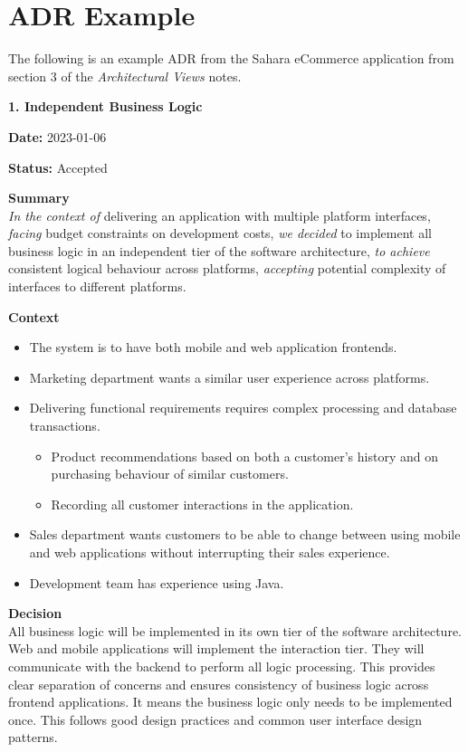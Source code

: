 \section{ADR Example}
The following is an example ADR from the Sahara eCommerce application from section 3 of the \textit{Architectural Views} notes.
\newline

\noindent\textbf{1. Independent Business Logic}

\noindent\textbf{Date:} 2023-01-06

\noindent\textbf{Status:} Accepted

\noindent\textbf{Summary}\\
\emph{In the context of} delivering an application with multiple platform interfaces,  
\emph{facing} budget constraints on development costs,  
\emph{we decided} to implement all business logic in an independent tier of the software architecture,  
\emph{to achieve} consistent logical behaviour across platforms,  
\emph{accepting} potential complexity of interfaces to different platforms.

\noindent\textbf{Context}
\begin{itemize}[noitemsep,nolistsep]
    \item The system is to have both mobile and web application frontends.
    \item Marketing department wants a similar user experience across platforms.
    \item Delivering functional requirements requires complex processing and database transactions.
    \begin{itemize}[noitemsep,nolistsep]
        \item Product recommendations based on both a customer's history and on purchasing behaviour of similar customers.
        \item Recording all customer interactions in the application.
    \end{itemize}
    \item Sales department wants customers to be able to change between using mobile and web applications without interrupting their sales experience.
    \item Development team has experience using Java.
\end{itemize}

\noindent\textbf{Decision}\\
All business logic will be implemented in its own tier of the software architecture.
Web and mobile applications will implement the interaction tier.
They will communicate with the backend to perform all logic processing.
This provides clear separation of concerns and ensures consistency of business logic across frontend applications.
It means the business logic only needs to be implemented once.
This follows good design practices and common user interface design patterns.

